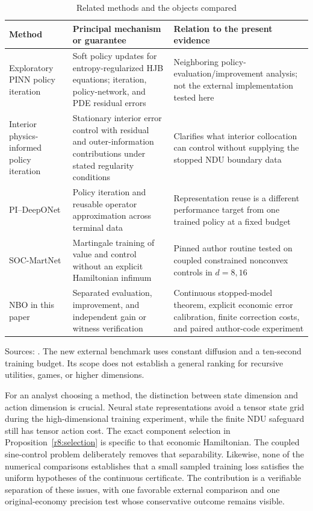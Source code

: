 \begin{table}[htbp]
\centering\small
\caption{Related methods and the objects compared}\label{r8:tab:literature}
\begin{tabularx}{\textwidth}{@{}p{}XX@{}}
\toprule
Method & Principal mechanism or guarantee & Relation to the present evidence\\
\midrule
Exploratory PINN policy iteration & Soft policy updates for entropy-regularized HJB equations; iteration, policy-network, and PDE residual errors & Neighboring policy-evaluation/improvement analysis; not the external implementation tested here\\
Interior physics-informed policy iteration & Stationary interior error control with residual and outer-information contributions under stated regularity conditions & Clarifies what interior collocation can control without supplying the stopped NDU boundary data\\
PI--DeepONet & Policy iteration and reusable operator approximation across terminal data & Representation reuse is a different performance target from one trained policy at a fixed budget\\
SOC-MartNet & Martingale training of value and control without an explicit Hamiltonian infimum & Pinned author routine tested on coupled constrained nonconvex controls in $d=8,16$\\
NBO in this paper & Separated evaluation, improvement, and independent gain or witness verification & Continuous stopped-model theorem, explicit economic error calibration, finite correction costs, and paired author-code experiment\\
\bottomrule
\end{tabularx}
\par\smallskip\footnotesize Sources: \citet{kim2026explore,kim2026interior,lee2025,cai2025published}. The new external benchmark uses constant diffusion and a ten-second training budget. Its scope does not establish a general ranking for recursive utilities, games, or higher dimensions.
\end{table}

For an analyst choosing a method, the distinction between state dimension and action dimension is crucial. Neural state representations avoid a tensor state grid during the high-dimensional training experiment, while the finite NDU safeguard still has tensor action cost. The exact component selection in Proposition~\ref{r8:selection} is specific to that economic Hamiltonian. The coupled sine-control problem deliberately removes that separability. Likewise, none of the numerical comparisons establishes that a small sampled training loss satisfies the uniform hypotheses of the continuous certificate. The contribution is a verifiable separation of these issues, with one favorable external comparison and one original-economy precision test whose conservative outcome remains visible.
